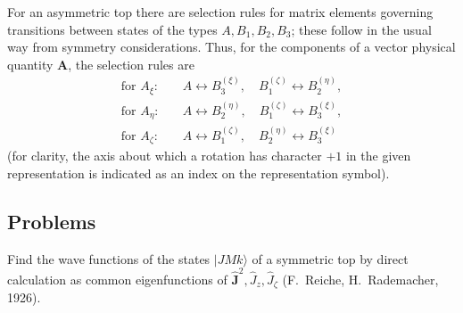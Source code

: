 For an asymmetric top there are selection rules for matrix elements governing transitions between states of the types $A,B_1,B_2,B_3$; these follow in the usual way from symmetry considerations. Thus, for the components of a vector physical quantity $\mathbf A$, the selection rules are
\begin{equation}
\begin{aligned}
\text{for }A_\xi:&\quad A\leftrightarrow B_3^{(\xi)},\quad B_1^{(\zeta)}\leftrightarrow B_2^{(\eta)},\\
\text{for }A_\eta:&\quad A\leftrightarrow B_2^{(\eta)},\quad B_1^{(\zeta)}\leftrightarrow B_3^{(\xi)},\\
\text{for }A_\zeta:&\quad A\leftrightarrow B_1^{(\zeta)},\quad B_2^{(\eta)}\leftrightarrow B_3^{(\xi)}
\end{aligned} \tag{103.16}
\end{equation}
(for clarity, the axis about which a rotation has character $+1$ in the given representation is indicated as an index on the representation symbol).

\subsection*{Problems}

 Find the wave functions of the states $|JMk\rangle$ of a symmetric top by direct calculation as common eigenfunctions of $\hat{\mathbf J}^{2},\hat J_z,\hat J_\zeta$ (F.~Reiche, H.~Rademacher, 1926).


